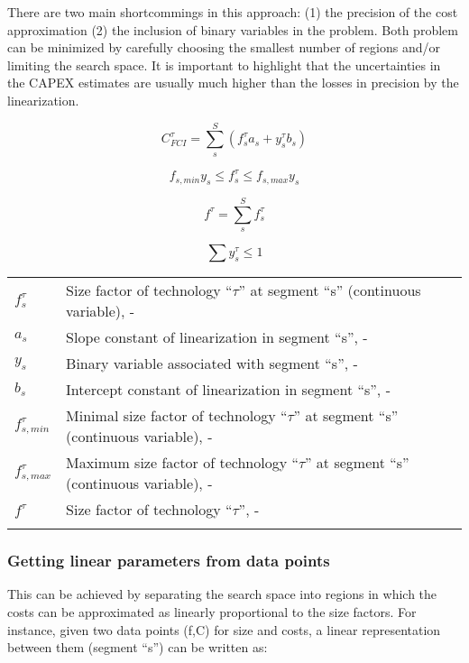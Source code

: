 \documentclass[10pt,twoside,a4paper]{report}
\begin{document}

There are two main shortcommings in this approach: (1) the precision
of the cost approximation (2) the inclusion of binary variables in the
problem. Both problem can be minimized by carefully choosing the
smallest number of regions and/or limiting the search space. It is
important to highlight that the uncertainties in the CAPEX estimates
are usually much higher than the losses in precision by the
linearization.


\begin{equation}
  \label{eq:costLin}
  C_{FCI}^\tau = \sum_s^S(f_s^\tau a_s + y_s^\tau b_s)
\end{equation}

\begin{equation}
  \label{eq:costLin2}
  f_{s,min}y_s \leq f_s^\tau \leq f_{s,max}y_s
\end{equation}

\begin{equation}
  \label{eq:costLin3}
  f^\tau = \sum_s^S f_s^\tau
\end{equation}

\begin{equation}
  \label{eq:costLin4}
  \sum y_s^\tau \leq 1
\end{equation}
\begin{tabular}[h]{ll}
  $f_s^\tau$ & Size factor of technology ``$\tau$'' at segment ``s'' (continuous variable), -\\
  $a_s$ & Slope constant of linearization in segment ``s'', - \\
  $y_s$ & Binary variable associated with segment ``s'', - \\
  $b_s$ & Intercept constant of linearization in segment ``s'', - \\
  $f_{s,min}^\tau$ & Minimal size factor of technology ``$\tau$'' at segment ``s'' (continuous variable), -\\
  $f_{s,max}^\tau$ & Maximum size factor of technology ``$\tau$'' at segment ``s'' (continuous variable), -\\
  $f^\tau$ & Size factor of technology ``$\tau$'', -\\
  \\
\end{tabular}


\subsubsection{Getting linear parameters from data points}
This can be achieved by separating the search space into regions in
which the costs can be approximated as linearly proportional to the
size factors. For instance, given two data points (f,C) for size and
costs, a linear representation between them (segment ``s'') can be
written as:
\end{document}
